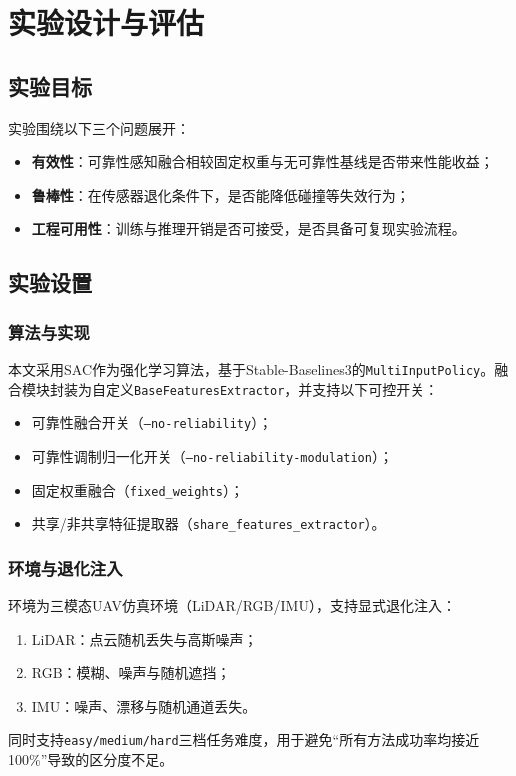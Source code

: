 \chapter{实验设计与评估}

\section{实验目标}
实验围绕以下三个问题展开：
\begin{itemize}
    \item \textbf{有效性}：可靠性感知融合相较固定权重与无可靠性基线是否带来性能收益；
    \item \textbf{鲁棒性}：在传感器退化条件下，是否能降低碰撞等失效行为；
    \item \textbf{工程可用性}：训练与推理开销是否可接受，是否具备可复现实验流程。
\end{itemize}

\section{实验设置}
\subsection{算法与实现}
本文采用SAC\cite{haarnoja2018sac}作为强化学习算法，基于Stable-Baselines3\cite{raffin2021sb3}的\texttt{MultiInputPolicy}。融合模块封装为自定义\texttt{BaseFeaturesExtractor}，并支持以下可控开关：
\begin{itemize}
    \item 可靠性融合开关（\texttt{--no-reliability}）；
    \item 可靠性调制归一化开关（\texttt{--no-reliability-modulation}）；
    \item 固定权重融合（\texttt{fixed\_weights}）；
    \item 共享/非共享特征提取器（\texttt{share\_features\_extractor}）。
\end{itemize}

\subsection{环境与退化注入}
环境为三模态UAV仿真环境（LiDAR/RGB/IMU），支持显式退化注入：
\begin{enumerate}
    \item LiDAR：点云随机丢失与高斯噪声；
    \item RGB：模糊、噪声与随机遮挡；
    \item IMU：噪声、漂移与随机通道丢失。
\end{enumerate}
同时支持\texttt{easy/medium/hard}三档任务难度，用于避免“所有方法成功率均接近100\%”导致的区分度不足。

